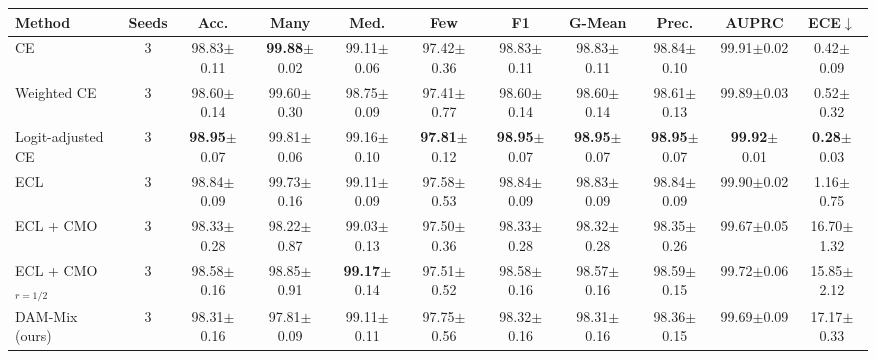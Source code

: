 \begin{tabular}{l c ccccccccc}
\toprule
Method & Seeds & Acc. & Many & Med. & Few & F1 & G-Mean & Prec. & AUPRC & ECE$\downarrow$ \\
\midrule
CE & 3 & 98.83{\scriptsize$\pm$0.11} & \textbf{99.88}{\scriptsize$\pm$0.02} & 99.11{\scriptsize$\pm$0.06} & 97.42{\scriptsize$\pm$0.36} & 98.83{\scriptsize$\pm$0.11} & 98.83{\scriptsize$\pm$0.11} & 98.84{\scriptsize$\pm$0.10} & 99.91{\scriptsize$\pm$0.02} & 0.42{\scriptsize$\pm$0.09} \\
Weighted CE & 3 & 98.60{\scriptsize$\pm$0.14} & 99.60{\scriptsize$\pm$0.30} & 98.75{\scriptsize$\pm$0.09} & 97.41{\scriptsize$\pm$0.77} & 98.60{\scriptsize$\pm$0.14} & 98.60{\scriptsize$\pm$0.14} & 98.61{\scriptsize$\pm$0.13} & 99.89{\scriptsize$\pm$0.03} & 0.52{\scriptsize$\pm$0.32} \\
Logit-adjusted CE & 3 & \textbf{98.95}{\scriptsize$\pm$0.07} & 99.81{\scriptsize$\pm$0.06} & 99.16{\scriptsize$\pm$0.10} & \textbf{97.81}{\scriptsize$\pm$0.12} & \textbf{98.95}{\scriptsize$\pm$0.07} & \textbf{98.95}{\scriptsize$\pm$0.07} & \textbf{98.95}{\scriptsize$\pm$0.07} & \textbf{99.92}{\scriptsize$\pm$0.01} & \textbf{0.28}{\scriptsize$\pm$0.03} \\
ECL & 3 & 98.84{\scriptsize$\pm$0.09} & 99.73{\scriptsize$\pm$0.16} & 99.11{\scriptsize$\pm$0.09} & 97.58{\scriptsize$\pm$0.53} & 98.84{\scriptsize$\pm$0.09} & 98.83{\scriptsize$\pm$0.09} & 98.84{\scriptsize$\pm$0.09} & 99.90{\scriptsize$\pm$0.02} & 1.16{\scriptsize$\pm$0.75} \\
ECL + CMO & 3 & 98.33{\scriptsize$\pm$0.28} & 98.22{\scriptsize$\pm$0.87} & 99.03{\scriptsize$\pm$0.13} & 97.50{\scriptsize$\pm$0.36} & 98.33{\scriptsize$\pm$0.28} & 98.32{\scriptsize$\pm$0.28} & 98.35{\scriptsize$\pm$0.26} & 99.67{\scriptsize$\pm$0.05} & 16.70{\scriptsize$\pm$1.32} \\
ECL + CMO$_{r=1/2}$ & 3 & 98.58{\scriptsize$\pm$0.16} & 98.85{\scriptsize$\pm$0.91} & \textbf{99.17}{\scriptsize$\pm$0.14} & 97.51{\scriptsize$\pm$0.52} & 98.58{\scriptsize$\pm$0.16} & 98.57{\scriptsize$\pm$0.16} & 98.59{\scriptsize$\pm$0.15} & 99.72{\scriptsize$\pm$0.06} & 15.85{\scriptsize$\pm$2.12} \\
\midrule
DAM-Mix (ours) & 3 & 98.31{\scriptsize$\pm$0.16} & 97.81{\scriptsize$\pm$0.09} & 99.11{\scriptsize$\pm$0.11} & 97.75{\scriptsize$\pm$0.56} & 98.32{\scriptsize$\pm$0.16} & 98.31{\scriptsize$\pm$0.16} & 98.36{\scriptsize$\pm$0.15} & 99.69{\scriptsize$\pm$0.09} & 17.17{\scriptsize$\pm$0.33} \\
\bottomrule
\end{tabular}
